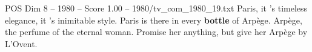 \begin{textsample}{POS Dim 8 – 1980 – Score 1.00 – 1980/tv\_com\_1980\_19.txt}  \label{ex:f8_pos_048}
Paris, it 's timeless elegance, it 's inimitable style.
Paris is there in every \textbf{bottle} of Arpège.
Arpège, the perfume of the eternal woman.
Promise her anything, but give her Arpège by L'Ovent.

\end{textsample}
